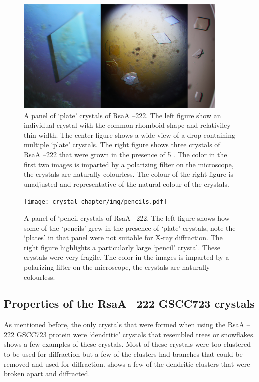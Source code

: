 \begin{figure}[htb]
  	\begin{center}
   		\includegraphics[width=0.9\textwidth]{crystal_chapter/img/goodxtal.jpg}
   	\end{center}
   	\caption[Panel of well diffracting `plate' crystals of RsaA --222]{A panel of `plate' crystals of RsaA --222. The left figure show an individual crystal with the common rhomboid shape and relativiley thin width. The center figure shows a wide-view of a drop containing multiple `plate' crystals. The right figure shows three crystals of RsaA --222 that were grown in the presence of 5 \millimolar{} . The color in the first two images is imparted by a polarizing filter on the microscope, the crystals are naturally colourless. The colour of the right figure is unadjusted and representative of the natural colour of the crystals.}
   	\label{fig:crystal-panel}
\end{figure}   
\begin{figure}[htb]
  	\begin{center}
   		\texttt{[image: crystal\_chapter/img/pencils.pdf]}
   	\end{center}
   	\caption[A panel of `pencil crystals of RsaA --222']{A panel of `pencil crystals of RsaA --222. The left figure shows how some of the `pencils' grew in the presence of `plate' crystals, note the `plates' in that panel were not suitable for X-ray diffraction. The right figure highlights a particularly large `pencil' crystal. These crystals were very fragile.  The color in the images is imparted by a polarizing filter on the microscope, the crystals are naturally colourless.} 
   	\label{fig:pencils}
\end{figure}   

\subsection{Properties of the RsaA --222 GSCC723 crystals}\label{sec:properties-rsaa-del}
As mentioned before, the only crystals that were formed when using the RsaA --222 GSCC723 protein were `dendritic' crystals that resembled trees or snowflakes.  shows a few examples of these crystals. Most of these crystals were too clustered to be used for diffraction but a few of the clusters had branches that could be removed and used for diffraction.  shows a few of the dendritic clusters that were broken apart and diffracted. 

